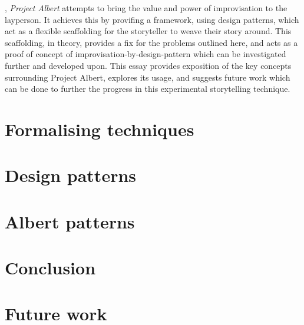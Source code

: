 \documentclass{tufte-handout}
\begin{document}
, \emph{Project Albert} attempts to bring the value and power of improvisation to the layperson. It achieves this by provifing a framework, using design patterns, which act as a flexible scaffolding for the storyteller to weave their story around. This scaffolding, in theory, provides a fix for the problems outlined here, and acts as a proof of concept of improvisation-by-design-pattern which can be investigated further and developed upon. This essay provides exposition of the key concepts surrounding Project Albert, explores its usage, and suggests future work which can be done to further the progress in this experimental storytelling technique.

\section{Formalising techniques}

\section{Design patterns}

\section{Albert patterns}

\section{Conclusion}

\section{Future work}
\end{document}

